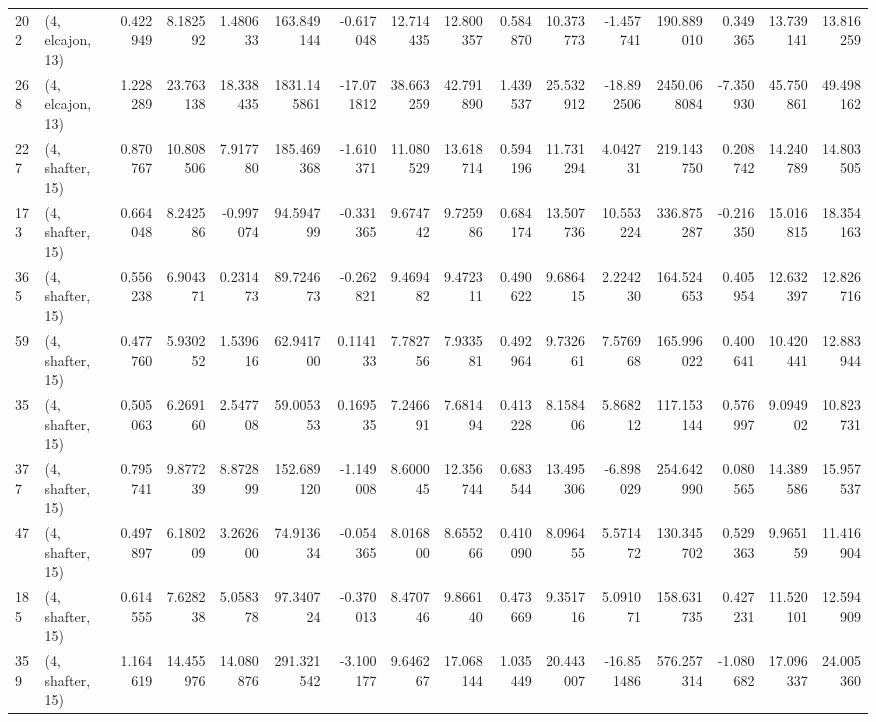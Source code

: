 \begin{tabular}{llrrrrrrrrrrrrrr}
202 &  (4, elcajon, 13) &   0.422949 &   8.182592 &   1.480633 &   163.849144 &  -0.617048 &  12.714435 &  12.800357 &  0.584870 &  10.373773 &  -1.457741 &    190.889010 &   0.349365 &   13.739141 &   13.816259 \\
268 &  (4, elcajon, 13) &   1.228289 &  23.763138 &  18.338435 &  1831.145861 & -17.071812 &  38.663259 &  42.791890 &  1.439537 &  25.532912 & -18.892506 &   2450.068084 &  -7.350930 &   45.750861 &   49.498162 \\
227 &  (4, shafter, 15) &   0.870767 &  10.808506 &   7.917780 &   185.469368 &  -1.610371 &  11.080529 &  13.618714 &  0.594196 &  11.731294 &   4.042731 &    219.143750 &   0.208742 &   14.240789 &   14.803505 \\
173 &  (4, shafter, 15) &   0.664048 &   8.242586 &  -0.997074 &    94.594799 &  -0.331365 &   9.674742 &   9.725986 &  0.684174 &  13.507736 &  10.553224 &    336.875287 &  -0.216350 &   15.016815 &   18.354163 \\
365 &  (4, shafter, 15) &   0.556238 &   6.904371 &   0.231473 &    89.724673 &  -0.262821 &   9.469482 &   9.472311 &  0.490622 &   9.686415 &   2.224230 &    164.524653 &   0.405954 &   12.632397 &   12.826716 \\
59  &  (4, shafter, 15) &   0.477760 &   5.930252 &   1.539616 &    62.941700 &   0.114133 &   7.782756 &   7.933581 &  0.492964 &   9.732661 &   7.576968 &    165.996022 &   0.400641 &   10.420441 &   12.883944 \\
35  &  (4, shafter, 15) &   0.505063 &   6.269160 &   2.547708 &    59.005353 &   0.169535 &   7.246691 &   7.681494 &  0.413228 &   8.158406 &   5.868212 &    117.153144 &   0.576997 &    9.094902 &   10.823731 \\
377 &  (4, shafter, 15) &   0.795741 &   9.877239 &   8.872899 &   152.689120 &  -1.149008 &   8.600045 &  12.356744 &  0.683544 &  13.495306 &  -6.898029 &    254.642990 &   0.080565 &   14.389586 &   15.957537 \\
47  &  (4, shafter, 15) &   0.497897 &   6.180209 &   3.262600 &    74.913634 &  -0.054365 &   8.016800 &   8.655266 &  0.410090 &   8.096455 &   5.571472 &    130.345702 &   0.529363 &    9.965159 &   11.416904 \\
185 &  (4, shafter, 15) &   0.614555 &   7.628238 &   5.058378 &    97.340724 &  -0.370013 &   8.470746 &   9.866140 &  0.473669 &   9.351716 &   5.091071 &    158.631735 &   0.427231 &   11.520101 &   12.594909 \\
359 &  (4, shafter, 15) &   1.164619 &  14.455976 &  14.080876 &   291.321542 &  -3.100177 &   9.646267 &  17.068144 &  1.035449 &  20.443007 & -16.851486 &    576.257314 &  -1.080682 &   17.096337 &   24.005360 \\

\end{tabular}
